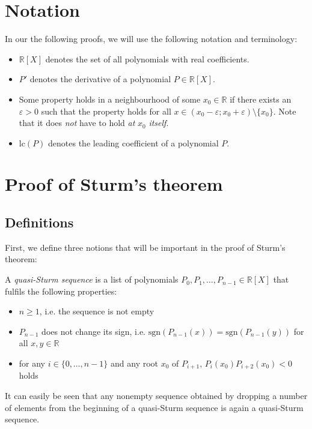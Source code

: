 \documentclass[11pt,a4paper,oneside]{article}
\newcommand{\RR}{\mathbb{R}}
\renewcommand{\epsilon}{\varepsilon}
\newcommand{\sgn}{\mathrm{sgn}}
\begin{document}
\section{Notation}
\label{sec:notation}
In our the following proofs, we will use the following notation and terminology:
\begin{itemize}
\item $\RR[X]$ denotes the set of all polynomials with real coefficients.
\item $P'$ denotes the derivative of a polynomial $P\in\RR[X]$.
\item Some property holds in a neighbourhood of some $x_0\in\RR$ if there exists an $\epsilon > 0$ such that the property holds for all $x\in (x_0-\epsilon;x_0+\epsilon)\setminus\{x_0\}$. Note that it does \emph{not} have to hold \emph{at} $x_0$ \emph{itself}.
\item $\mathrm{lc}(P)$ denotes the leading coefficient of a polynomial $P$.
\end{itemize}


\newpage
\section{Proof of Sturm's theorem}

\subsection{Definitions}
\label{sec:defs}

First, we define three notions that will be important in the proof of Sturm's theorem:

A \emph{quasi-Sturm sequence} is a list of polynomials $P_0,P_1,\ldots,P_{n-1} \in \RR[X]$ that fulfils the following properties:
\begin{itemize}
\item $n \geq 1$, i.e. the sequence is not empty
\item $P_{n-1}$ does not change its sign, i.e. $\sgn(P_{n-1}(x))=\sgn(P_{n-1}(y))$ for all $x,y\in\RR$
\item for any $i\in\{0,\ldots,n-1\}$ and any root $x_0$ of $P_{i+1}$, $P_{i}(x_0)P_{i+2}(x_0) < 0$ holds
\end{itemize}
It can easily be seen that any nonempty sequence obtained by dropping a number of elements from the beginning of a quasi-Sturm sequence is again a quasi-Sturm sequence.\\
\end{document}
